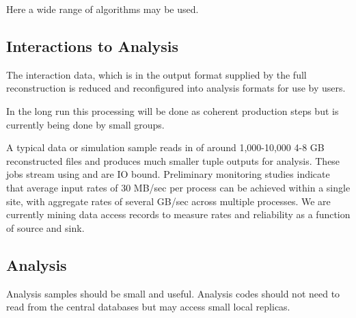 \documentclass[../main-00.tex]{subfiles}
\begin{document}
Here a wide range of algorithms may be used.  

\subsection{Interactions to Analysis}
The interaction data, which is in the output format supplied by the full reconstruction is reduced and reconfigured into analysis formats for use by users. 

In the long run this processing will be done as coherent production steps but is currently being done by small groups.

A typical  data or simulation sample reads in  of around 1,000-10,000 4-8 GB reconstructed files and produces much smaller tuple outputs for analysis.  These jobs stream using  and are IO bound. Preliminary monitoring studies indicate that average input rates of 30 MB/sec per process can be achieved within a single site, with aggregate rates of several GB/sec across multiple processes. We are currently mining data access records to measure rates and reliability as a function of source and sink. 

\subsection{Analysis}
Analysis samples should be small and useful.  Analysis codes should not need to read from the central databases but may access small local replicas. 
\end{document}
